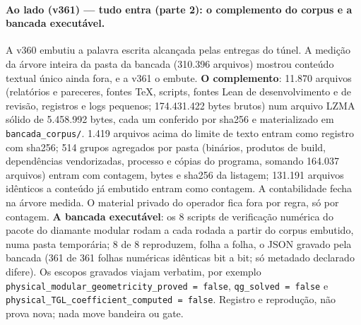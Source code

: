 \documentclass[11pt]{article}
\theoremstyle{definition}\newtheorem{deriv}{Derivação}
\begin{document}
\paragraph*{Ao lado (v361) --- tudo entra (parte 2): o complemento do corpus e a bancada executável.} A v360 embutiu a palavra escrita alcançada pelas entregas do túnel. A medição da árvore inteira da pasta da bancada (310.396 arquivos) mostrou conteúdo textual único ainda fora, e a v361 o embute. \textbf{O complemento}: 11.870 arquivos (relatórios e pareceres, fontes TeX, scripts, fontes Lean de desenvolvimento e de revisão, registros e logs pequenos; 174.431.422 bytes brutos) num arquivo LZMA sólido de 5.458.992 bytes, cada um conferido por sha256 e materializado em \texttt{bancada\_corpus/}. 1.419 arquivos acima do limite de texto entram como registro com sha256; 514 grupos agregados por pasta (binários, produtos de build, dependências vendorizadas, processo e cópias do programa, somando 164.037 arquivos) entram com contagem, bytes e sha256 da listagem; 131.191 arquivos idênticos a conteúdo já embutido entram como contagem. A contabilidade fecha na árvore medida. O material privado do operador fica fora por regra, só por contagem. \textbf{A bancada executável}: os 8 scripts de verificação numérica do pacote do diamante modular rodam a cada rodada a partir do corpus embutido, numa pasta temporária; 8 de 8 reproduzem, folha a folha, o JSON gravado pela bancada (361 de 361 folhas numéricas idênticas bit a bit; só metadado declarado difere). Os escopos gravados viajam verbatim, por exemplo \texttt{physical\_modular\_geometricity\_proved = false}, \texttt{qg\_solved = false} e \texttt{physical\_TGL\_coefficient\_computed = false}. Registro e reprodução, não prova nova; nada move bandeira ou gate.
\end{document}
